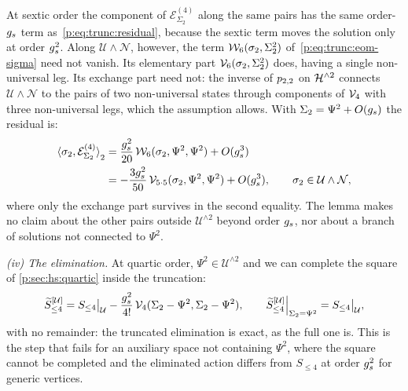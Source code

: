 At sextic order the component of $\mathcal E^{(4)}_{\Sigma_2}$ along the same pairs has the same order-$\gs$ term as~\eqref{p:eq:trunc:residual}, because the sextic term moves the solution only at order $\gs^2$.
Along $\mathcal U \wedge \mathcal N$, however, the term $\dvertex{6}(\sigma_2, \Sigma_2^2)$ of~\eqref{p:eq:trunc:eom-sigma} need not vanish.
Its elementary part $\vertex{6}(\sigma_2, \Sigma_2^2)$ does, having a single non-universal leg.
Its exchange part need not: the inverse of $\sprod{2}{2}$ on $\Hn{2}$ connects $\mathcal U \wedge \mathcal N$ to the pairs of two non-universal states through components of $\vertex{4}$ with three non-universal legs, which the assumption allows.
With $\Sigma_2 = \Psi^2 + O(\gs)$ the residual is:
\begin{equation}
\label{p:eq:trunc:residual-sextic}
\begin{aligned}
  \pair[2]{\sigma_2}{\mathcal E^{(4)}_{\Sigma_2}}
    &
    = \frac{\gs^2}{20} \, \dvertex{6}(\sigma_2, \Psi^2, \Psi^2)
      + O(\gs^3)
    \\
    &
    = - \frac{3 \gs^2}{50} \, \vertex{5 \cdot 5}(\sigma_2, \Psi^2, \Psi^2)
      + O(\gs^3),
  \qquad
  \sigma_2 \in \mathcal U \wedge \mathcal N,
\end{aligned}
\end{equation}
where only the exchange part survives in the second equality.
The lemma makes no claim about the other pairs outside $\mathcal U^{\wedge 2}$ beyond order $\gs$, nor about a branch of solutions not connected to $\Psi^2$.

\emph{(iv) The elimination.}
At quartic order, $\Psi^2 \in \mathcal U^{\wedge 2}$ and we can complete the square of \cref{p:sec:hs:quartic} inside the truncation:
\begin{equation}
  \label{p:eq:trunc:eliminate-quartic}
  \caction[\le 4]^{[\mathcal U]}
    = S_{\le 4} \big|_{\mathcal U}
      - \frac{\gs^2}{4!} \, \vertex{4}(\Sigma_2 - \Psi^2, \Sigma_2 - \Psi^2),
  \qquad
  \caction[\le 4]^{[\mathcal U]} \Big|_{\Sigma_2 = \Psi^2}
    = S_{\le 4} \big|_{\mathcal U},
\end{equation}
with no remainder: the truncated elimination is exact, as the full one is.
This is the step that fails for an auxiliary space not containing $\Psi^2$, where the square cannot be completed and the eliminated action differs from $S_{\le 4}$ at order $\gs^2$ for generic vertices.

